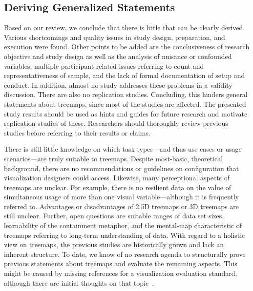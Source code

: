 \documentclass[sigconf,
natbib=true]{acmart}
\begin{document}
\subsection{Deriving Generalized Statements}%
\label{sec:discussion}
Based on our review, we conclude that there is little that can be clearly derived.
Various shortcomings and quality issues in study design, preparation, and execution were found.
Other points to be added are the conclusiveness of research objective and study design as well as the analysis of nuisance or confounded variables, multiple participant related issues referring to count and representativeness of sample, and the lack of formal documentation of setup and conduct.
In addition, almost no study addresses these problems in a validity discussion.
There are also no replication studies.
Concluding, this hinders general statements about treemaps, since most of the studies are affected.
The presented study results should be used as hints and guides for future research and motivate replication studies of these.
Researchers should thoroughly review previous studies before referring to their results or claims.

There is still little knowledge on which task types---and thus use cases or usage scenarios---are truly suitable to treemaps.
Despite most-basic, theoretical background, there are no recommendations or guidelines on configuration that visualization designers could access.
Likewise, many perceptional aspects of treemaps are unclear.
For example, there is no resilient data on the value of simultaneous usage of more than one visual variable---although it is frequently referred to.
Advantages or disadvantages of 2.5D treemaps or 3D treemaps are still unclear.
Further, open questions are suitable ranges of data set sizes, learnability of the containment metaphor, and the mental-map characteristic of treemaps referring to long-term understanding of data.
With regard to a holistic view on treemaps, the previous studies are historically grown and lack an inherent structure.
To date, we know of no research agenda to structurally prove previous statements about treemaps and evaluate the remaining aspects.
This might be caused by missing references for a visualization evaluation standard, although there are initial thoughts on that topic~\cite{zuk2006-heuristics}.
\end{document}
